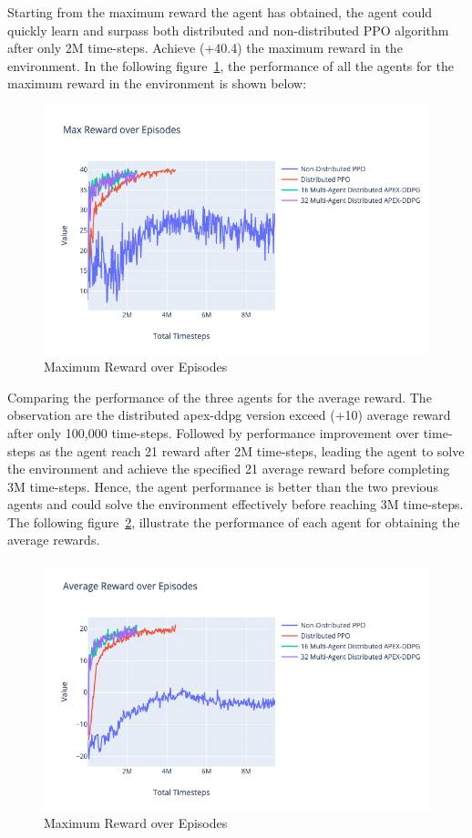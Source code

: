 Starting from the maximum reward the agent has obtained, the agent could quickly learn and surpass both distributed and non-distributed PPO algorithm after only 2M time-steps. Achieve (+40.4) the maximum reward in the environment. In the following figure~\ref{fig:3rd_exp_max_eps_reward}, the performance of all the agents for the maximum reward in the environment is shown below:
\begin{figure}[!htb]
	\centering
	\includegraphics[width=\linewidth]{figures/exps/3rd_exp/max_eps_reward.png}
	\caption{Maximum Reward over Episodes}
	\label{fig:3rd_exp_max_eps_reward}
\end{figure}

Comparing the performance of the three agents for the average reward. The observation are the distributed apex-ddpg version exceed (+10) average reward after only 100,000 time-steps. Followed by performance improvement over time-steps as the agent reach 21 reward after 2M time-steps, leading the agent to solve the environment and achieve the specified 21 average reward before completing 3M time-steps. Hence, the agent performance is better than the two previous agents and could solve the environment effectively before reaching 3M time-steps. The following figure~\ref{fig:3rd_exp_avg_eps_reward}, illustrate the performance of each agent for obtaining the average rewards.
\begin{figure}[!htb]
	\centering
	\includegraphics[width=\linewidth]{figures/exps/3rd_exp/avg_eps_reward.png}
	\caption{Maximum Reward over Episodes}
	\label{fig:3rd_exp_avg_eps_reward}
\end{figure}

